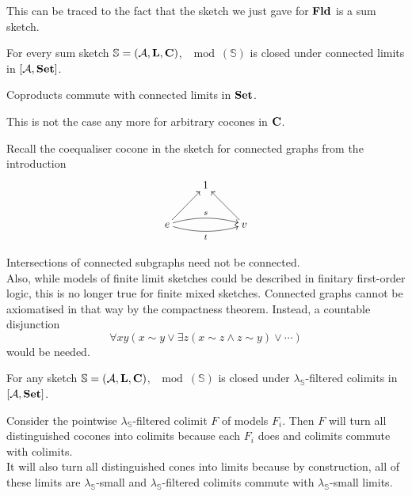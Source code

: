 This can be traced to the fact that the sketch we just gave for $\mathbf{Fld}$ is a sum sketch. 

\begin{Proposition}\label{prop:sumconnectedlimits}
For every sum sketch $\mathbb S = (\mathcal{A}, \textbf{L}, \textbf{C})$, $\mod(\mathbb S)$ is closed under connected limits in $[\mathcal{A},\mathbf{Set}]$.
\end{Proposition}
\begin{Proof}
Coproducts commute with connected limits in $\mathbf{Set}$. \cite[Theorem 3.3.2]{MakkaiPare}
\end{Proof}

This is not the case any more for arbitrary cocones in $\textbf{C}$.
\begin{Example} 
\label{ex:cxgraph}
Recall the coequaliser cocone in the sketch for connected graphs from the introduction
\[
\xymatrix{
& 1 \\
e \ar@/^/[rr]^{s} \ar@/_/[rr]_{t} \ar[ru] & & v \ar[lu] \\
}\]
\end{Example}
Intersections of connected subgraphs need not be connected. \\

Also, while models of finite limit sketches could be described in finitary first-order logic, this is no longer true for finite mixed sketches. Connected graphs cannot be axiomatised in that way by the compactness theorem. Instead, a countable disjunction
\[ \forall x y \left(x \sim y \vee \exists z(x \sim z \wedge z \sim y) \vee \cdots\right) \] would be needed.

\begin{Proposition}\label{prop:modsdirectedcolimits}
For any sketch $\mathbb S = (\mathcal{A}, \textbf{L}, \textbf{C})$, $\mod(\mathbb S)$ is closed under $\lambda_\mathbb S$-filtered colimits in $[\mathcal{A},\mathbf{Set}]$.
\end{Proposition}
\begin{Proof}
Consider the pointwise $\lambda_\mathbb S$-filtered colimit $F$ of models $F_i$. Then $F$ will turn all distinguished cocones into colimits because each $F_i$ does and colimits commute with colimits. \\

It will also turn all distinguished cones into limits because by construction, all of these limits are $\lambda_\mathbb S$-small and $\lambda_\mathbb S$-filtered colimits commute with $\lambda_\mathbb S$-small limits.
\end{Proof}